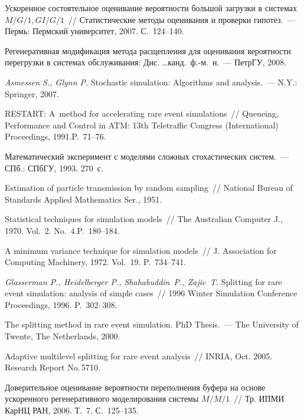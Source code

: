 \begin{multicols}{2}
{{\begin{thebibliography}{99}
 Ускоренное состоятельное оценивание
    вероятности большой загрузки в сис\-те\-мах $M/G/1, GI/G/1$~//
     Статистические методы оценивания и проверки гипотез.~---
      Пермь: Пермский университет, 2007. С.~124--140.

 Регенеративная модификация метода расщепления
для оценивания вероятности перегрузки в системах обслуживания:
Дис. \ldots канд.\ \mbox{ф.-м. н.}~--- ПетрГУ, 2008.

{\it Asmessen S., Glynn P.} Stochastic simulation: Algorithms and
analysis.~--- N.Y.: Springer, 2007.

RESTART: A~method
for accelerating rare event simulations~// Queueing, Performance and
Control in ATM: 13th  Teletraffic
Congress (International) Proceedings, 1991.\linebreak P.~71--76.

  Математический эксперимент
с  моделями сложных стохастических систем.~--- СПб.:  СПбГУ, 1993. 270~с.

 Estimation of particle transmission by
random sampling~// National Bureau of Standards Applied Mathematics
Ser., 1951.

 Statistical techniques for simulation models~//
The Australian Computer J., 1970. Vol.~2. No.~4.\linebreak P.~180--184.

 A minimum variance technique for simulation models~// J. 
Association for Computing Machinery, 1972. Vol.~19. P.~734--741.


{\it Glasserman P.,  Heidelberger P.,  Shahabuddin~P.,  Zajic~T.}
Splitting for rare event simulation: analysis of simple cases~// 
1996 Winter Simulation Conference Proceedings, 1996. P.~302--308.

The splitting method in rare event simulation. PhD Thesis.~--- The
University of Twente, The Netherlands, 2000.

  Adaptive multilevel splitting for rare
event analysis~// INRIA, Oct. 2005. Research Report No.\,5710.

 Доверительное оценивание вероятности переполнения буфера на основе ускоренного
    регенеративного моделирования системы $M/M/1$~// Тр. ИПМИ КарНЦ РАН, 2006. Т.~7. С.~125--135.


\end{thebibliography}}}
\end{multicols}
